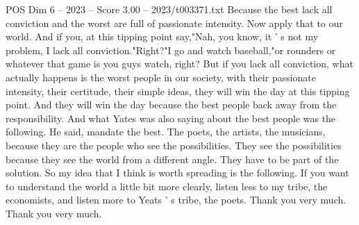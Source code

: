 \begin{textsample}{POS Dim 6 – 2023 – Score 3.00 – 2023/t003371.txt}
Because the best lack all conviction and the worst are full of passionate intensity.
Now apply that to our world.
And if you, at this tipping point say,"Nah, you know, it ' s not my problem, I lack all conviction."Right?"I go and watch baseball,"or rounders or whatever that game is you guys watch, right?
But if you lack all conviction, what actually happens is the worst people in our society, with their passionate intensity, their certitude, their simple ideas, they will win the day at this tipping point.
And they will win the day because the best people back away from the responsibility.
And what Yates was also saying about the best people was the following.
He said, mandate the best.
The poets, the artists, the musicians, because they are the people who see the possibilities.
They see the possibilities because they see the world from a different angle.
They have to be part of the solution.
So my idea that I think is worth spreading is the following.
If you want to understand the world a little bit more clearly, listen less to my tribe, the economists, and listen more to Yeats ' s tribe, the poets.
Thank you very much.
Thank you very much.

\end{textsample}
